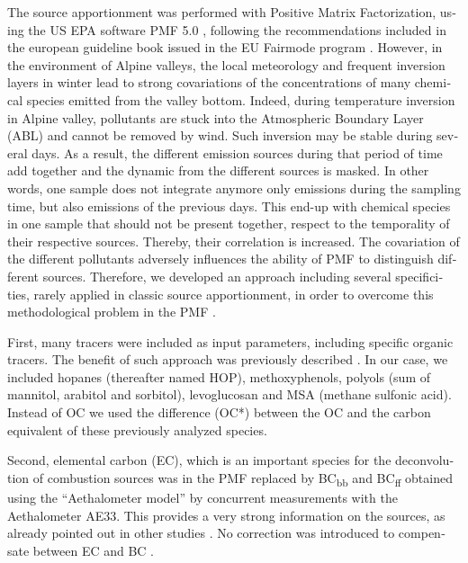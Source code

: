 \begin{otherlanguage}{english}
The source apportionment was performed with Positive Matrix Factorization, using
the US EPA software PMF 5.0 \parencite{usepaPositive2017}, following the
recommendations included in the european guideline book issued in the EU Fairmode program
\parencite{belisEuropean2014}. However, in the environment of Alpine valleys, the
local meteorology and frequent inversion layers in winter lead to strong
covariations of the concentrations of many chemical species emitted from the
valley bottom.
Indeed, during temperature inversion in Alpine valley, pollutants are stuck into
the Atmospheric Boundary Layer (ABL) and cannot be removed by wind. Such
inversion may be stable during several days. As a result, the different emission
sources during that period of time add together and the dynamic from the
different sources is masked. In other words, one sample does not integrate
anymore only emissions during the sampling time, but also emissions of the
previous days. This end-up with chemical species in one sample that should not
be present together, respect to the temporality of their respective sources.
Thereby, their correlation is increased.
The covariation of the different pollutants adversely influences the ability of
PMF to distinguish different sources.
Therefore, we developed an approach including several specificities, rarely
applied in classic source apportionment, in order to overcome this
methodological problem in the PMF \parencite{chevrierChauffage2016}.

First, many tracers were included as input parameters, including specific
organic tracers. The benefit of such approach was previously described
\parencite{gollyEtude2014,wakedSource2014,srivastavaSpeciation2017}. In our
case, we included hopanes (thereafter named HOP), methoxyphenols, polyols (sum
of mannitol, arabitol and sorbitol), levoglucosan and MSA (methane sulfonic
acid). Instead of OC we used the difference (OC*) between the OC and
the carbon equivalent of these previously analyzed species.

Second, elemental carbon (EC), which is an important species for the
deconvolution of combustion sources was in the PMF replaced by
BC\textsubscript{bb} and BC\textsubscript{ff} obtained using the ``Aethalometer
model'' by concurrent measurements with the Aethalometer AE33. This provides a
very strong information on the sources, as already pointed out in other studies
\parencite{petitTwo2015}. No correction was introduced to compensate between EC
and BC \parencite{zanattaEuropean2016}.


\end{otherlanguage}
